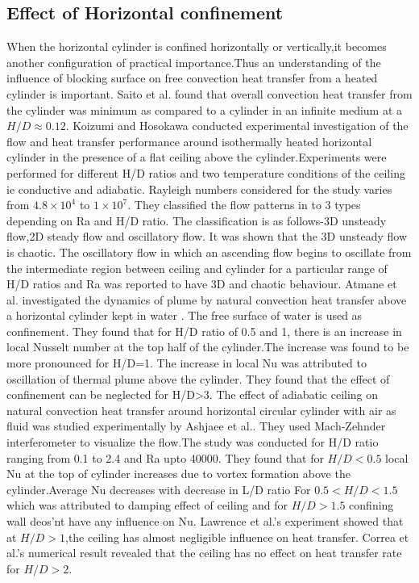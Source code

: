\subsection{Effect of Horizontal confinement}
\hspace{1cm}When the horizontal cylinder is confined horizontally or vertically,it becomes  another configuration of practical importance.Thus an understanding of the influence of blocking surface on free convection heat transfer from a heated cylinder is important. Saito et al.\cite{sai} found that overall convection heat transfer from the cylinder was minimum as compared to a cylinder in an infinite medium  at a $H/D\approx 0.12$. Koizumi and Hosokawa\cite{koizumi} conducted experimental investigation of the flow and heat transfer performance around isothermally heated horizontal cylinder in the presence of a flat ceiling above the cylinder.Experiments were performed for different H/D ratios and two temperature conditions of the ceiling ie conductive and adiabatic. Rayleigh numbers considered for the study  varies from $4.8\times10^4$ to $1\times10^7$. They classified the flow patterns in to 3 types depending on Ra and H/D ratio. The classification is as follows-3D unsteady flow,2D steady flow and oscillatory flow. It was shown that the 3D unsteady flow is chaotic. The oscillatory flow in which an ascending flow begins to oscillate from the intermediate region between ceiling and cylinder for a particular range of H/D ratios and Ra was reported to have 3D and chaotic behaviour. Atmane et al.\cite{atma} investigated the dynamics of plume by natural convection heat transfer above a horizontal cylinder kept in water . The free surface of water is used as confinement. They found that for H/D ratio of 0.5 and 1, there is an increase in local Nusselt number at the top half of the cylinder.The increase was found to be more pronounced for H/D=1. The increase in local Nu was attributed to oscillation of thermal plume above the cylinder. They found that the effect of confinement can be neglected for H/D>3. The effect of adiabatic ceiling on natural convection heat transfer around horizontal circular cylinder with air as fluid was studied experimentally by Ashjaee et al.\cite{ashjaee}. They used Mach-Zehnder interferometer to visualize the flow.The study was conducted for H/D ratio ranging from 0.1 to 2.4 and Ra upto 40000. They found that for $H/D<0.5$ local Nu at the top of cylinder increases due to vortex formation above the cylinder.Average Nu decreases with decrease in L/D ratio For $0.5<H/D<1.5$  which was attributed to damping effect of ceiling and for $H/D>1.5$ confining wall deos'nt have any influence on Nu. Lawrence et al.'s\cite{law} experiment showed that at $H/D>1$,the ceiling has almost negligible influence on heat transfer. Correa et al.'s\cite{correa} numerical result revealed that the ceiling has no effect on heat transfer rate for $H/D>2$. 

